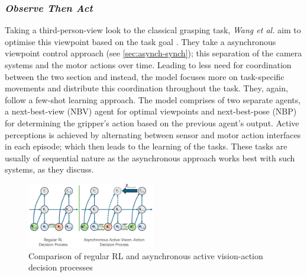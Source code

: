 \subsubsection{\emph{Observe Then Act}}
Taking a third-person-view look to the classical grasping task, \emph{Wang et al.} aim to optimise this viewpoint based on the task goal \cite{wang2024observeactasynchronousactive}. They take a asynchronous viewpoint control approach (see \ref{sec:asynch-synch}); this separation of the camera systems and the motor actions over time. Leading to less need for coordination between the two section and instead, the model focuses more on task-specific movements and distribute this coordination throughout the task. 
They, again, follow a few-shot learning approach. The model comprises of two separate agents, a next-best-view (NBV) agent for optimal viewpoints and next-best-pose (NBP) for determining the gripper's action based on the previous agent's output. Active perceptions is achieved by alternating between sensor and motor action interfaces in each episode; which then leads to the learning of the tasks. These tasks are usually of sequential nature as the asynchronous approach works best with such systems, as they discuss.
\begin{figure}[h]
  \centering
  \includegraphics[width=0.5\textwidth]{assets/rel-work/ota-asynch-policy.png}
  \caption{Comparison of regular RL and asynchronous active vision-action decision processes \cite{wang2024observeactasynchronousactive}}\label{fig:oat-neurons}
\end{figure}

